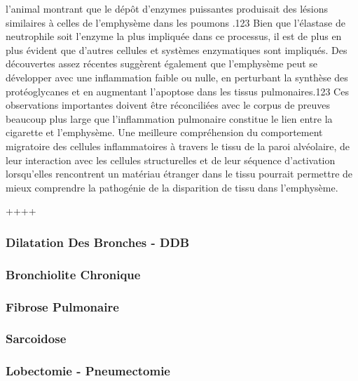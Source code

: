 \documentclass[12pt,]{article}
\begin{document}
l'animal montrant que le dépôt d'enzymes puissantes produisait des
lésions similaires à celles de l'emphysème dans les poumons .123 Bien
que l'élastase de neutrophile soit l'enzyme la plus impliquée dans ce
processus, il est de plus en plus évident que d'autres cellules et
systèmes enzymatiques sont impliqués. Des découvertes assez récentes
suggèrent également que l'emphysème peut se développer avec une
inflammation faible ou nulle, en perturbant la synthèse des
protéoglycanes et en augmentant l'apoptose dans les tissus
pulmonaires.123 Ces observations importantes doivent être réconciliées
avec le corpus de preuves beaucoup plus large que l'inflammation
pulmonaire constitue le lien entre la cigarette et l'emphysème. Une
meilleure compréhension du comportement migratoire des cellules
inflammatoires à travers le tissu de la paroi alvéolaire, de leur
interaction avec les cellules structurelles et de leur séquence
d'activation lorsqu'elles rencontrent un matériau étranger dans le tissu
pourrait permettre de mieux comprendre la pathogénie de la disparition
de tissu dans l'emphysème.

++++

\hypertarget{dilatation-des-bronches---ddb}{%
\subsubsection{Dilatation Des Bronches -
DDB}\label{dilatation-des-bronches---ddb}}

\hypertarget{bronchiolite-chronique}{%
\subsubsection{Bronchiolite Chronique}\label{bronchiolite-chronique}}

\hypertarget{fibrose-pulmonaire}{%
\subsubsection{Fibrose Pulmonaire}\label{fibrose-pulmonaire}}

\hypertarget{sarcoidose}{%
\subsubsection{Sarcoidose}\label{sarcoidose}}

\hypertarget{lobectomie---pneumectomie}{%
\subsubsection{Lobectomie -
Pneumectomie}\label{lobectomie---pneumectomie}}
\end{document}
